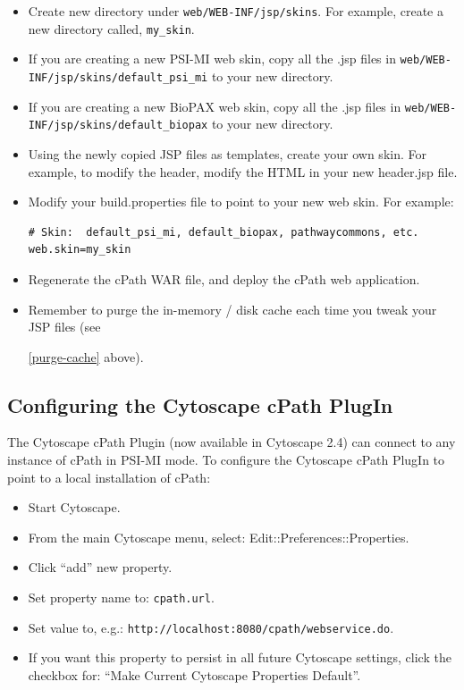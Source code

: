 \documentclass[letterpaper,12pt]{article}
\begin{document}
\begin{itemize}

\item Create new directory under \verb+web/WEB-INF/jsp/skins+.  For example, create a new directory called, \verb+my_skin+.

\item If you are creating a new PSI-MI web skin, copy all the .jsp files in \verb+web/WEB-INF/jsp/skins/default_psi_mi+ to your new directory.

\item If you are creating a new BioPAX web skin, copy all the .jsp files in \verb+web/WEB-INF/jsp/skins/default_biopax+ to your new directory.

\item Using the newly copied JSP files as templates, create your own skin.  For example, to modify the header, modify the HTML in your new header.jsp file.

\item Modify your build.properties file to point to your new web skin.  For example:

\begin{verbatim}
# Skin:  default_psi_mi, default_biopax, pathwaycommons, etc.
web.skin=my_skin
\end{verbatim}

\item Regenerate the cPath WAR file, and deploy the cPath web application.

\item Remember to purge the in-memory / disk cache each time you tweak your JSP files (see

\ref{purge-cache} above).
\end{itemize}

\subsection{Configuring the Cytoscape cPath PlugIn}

The Cytoscape cPath Plugin (now available in Cytoscape 2.4) can connect to any instance of cPath in PSI-MI mode.  To configure the Cytoscape cPath PlugIn to point to a local installation of cPath:

\begin{itemize}
\item Start Cytoscape.

\item From the main Cytoscape menu, select:  Edit::Preferences::Properties.

\item Click ``add'' new property.

\item Set property name to:  \verb+cpath.url+.

\item Set value to, e.g.:  \verb+http://localhost:8080/cpath/webservice.do+.

\item If you want this property to persist in all future Cytoscape settings, click the checkbox for:  ``Make Current Cytoscape Properties Default''.
\end{itemize}
\end{document}
